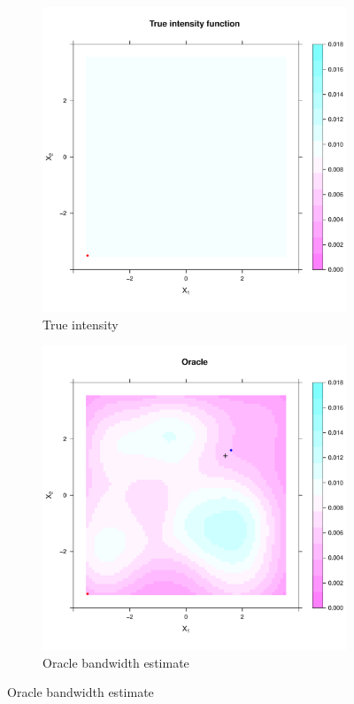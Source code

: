 \begin{figure}[htbp]
    \centering
    \begin{subfigure}[t]{0.45\textwidth}
    \includegraphics[width=\textwidth]{results/unif_100_unif/output/true_intensity_heatmap}
    \caption{True intensity}
    \end{subfigure}%
    \begin{subfigure}[t]{0.45\textwidth}
    \includegraphics[width=\textwidth]{results/unif_100_unif/output/oracle_intensity_heatmap}
    \caption{Oracle bandwidth estimate}
    \end{subfigure}



\end{figure}
